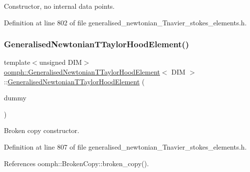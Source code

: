 Constructor, no internal data points. 



Definition at line 802 of file generalised\+\_\+newtonian\+\_\+\+Tnavier\+\_\+stokes\+\_\+elements.\+h.

\mbox{\label{classoomph_1_1GeneralisedNewtonianTTaylorHoodElement_a8efc8bf9d38227d7f8db4bb9fe5fdd38}} 
\subsubsection{\texorpdfstring{Generalised\+Newtonian\+T\+Taylor\+Hood\+Element()}{GeneralisedNewtonianTTaylorHoodElement()}\hspace{0.1cm}{\footnotesize\ttfamily [2/2]}}
{\footnotesize\ttfamily template$<$unsigned D\+IM$>$ \\
\hyperlink{classoomph_1_1GeneralisedNewtonianTTaylorHoodElement}{oomph\+::\+Generalised\+Newtonian\+T\+Taylor\+Hood\+Element}$<$ D\+IM $>$\+::\hyperlink{classoomph_1_1GeneralisedNewtonianTTaylorHoodElement}{Generalised\+Newtonian\+T\+Taylor\+Hood\+Element} (\begin{DoxyParamCaption}\item[{const \hyperlink{classoomph_1_1GeneralisedNewtonianTTaylorHoodElement}{Generalised\+Newtonian\+T\+Taylor\+Hood\+Element}$<$ D\+IM $>$ \&}]{dummy }\end{DoxyParamCaption})\hspace{0.3cm}{\ttfamily [inline]}}



Broken copy constructor. 



Definition at line 807 of file generalised\+\_\+newtonian\+\_\+\+Tnavier\+\_\+stokes\+\_\+elements.\+h.



References oomph\+::\+Broken\+Copy\+::broken\+\_\+copy().



